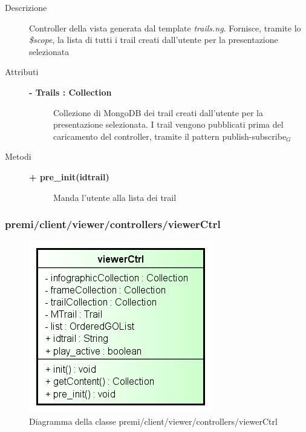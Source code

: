 \begin{description}
\item[Descrizione] \hfill
	Controller della vista generata dal template \textit{trails.ng}. Fornisce, tramite lo \textit{\$scope}, la lista di tutti i trail creati dall'utente per la presentazione selezionata
	

	
\item[Attributi] \hfill
	\begin{description}
		\item[\textbf{- Trails : Collection			}] \hfill
			Collezione di MongoDB dei trail creati dall'utente per la presentazione selezionata. I trail vengono pubblicati prima del caricamento del controller, tramite il pattern publish-subscribe$_G$
	\end{description}
	
	
\item[Metodi] \hfill

	\begin{description}
		\item[\textbf{\color{blue}+ pre\_init(idtrail)			}] \hfill
			Manda l'utente alla lista dei trail
	\end{description}	

\end{description}



\subsubsection{premi/client/viewer/controllers/viewerCtrl}
\begin{figure}[H]
\begin{center}
\includegraphics[scale=0.55]{img/diacla/viewerCtrl.png}
\caption{Diagramma della classe premi/client/viewer/controllers/viewerCtrl}
\end{center}
\end{figure}


